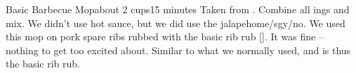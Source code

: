 \newpage
\begin{recipe}{Basic Barbecue Mop}{about 2 cups}{15 minutes}
\freeform Taken from \emph{}.
Combine all ings and mix.
\freeform We didn't use hot sauce, but we did use the jalape\/home/sgy/{n}o.  We used this mop on pork spare ribs rubbed with the basic rib rub \ref{}.  It was fine -- nothing to get too excited about.  Similar to what we normally used, and is thus the basic rib rub.
\end{recipe}

